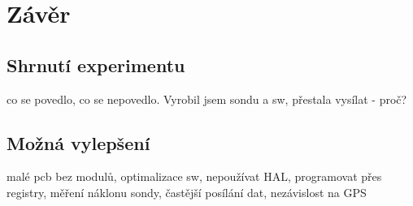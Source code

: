 \documentclass[twoside]{ctuthesis}
\theoremstyle{plain}
\theoremstyle{definition}
\theoremstyle{note}
\begin{document}
	


\chapter{Závěr}
	\section{Shrnutí experimentu}
	co se povedlo, co se nepovedlo. Vyrobil jsem sondu a sw, přestala vysílat - proč? 

	\section{Možná vylepšení}
	malé pcb bez modulů, optimalizace sw, nepoužívat HAL, programovat přes registry, měření náklonu sondy, častější posílání dat, nezávislost na GPS

	
















	


\appendix

\printindex

\appendix




\end{document}
